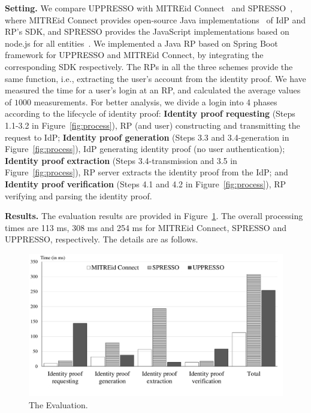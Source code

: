 \noindent\textbf{Setting.}
We compare UPPRESSO with MITREid Connect~\cite{MITREid} and SPRESSO~\cite{SPRESSO}, 
 where MITREid Connect provides open-source Java implementations~\cite{MITREid} of IdP and RP's SDK, 
  and SPRESSO provides the JavaScript implementations based on node.js for all entities~\cite{SPRESSO}.
We implemented a Java RP based on Spring Boot framework for UPPRESSO and MITREid Connect, by integrating the corresponding SDK respectively.
The RPs in all the three schemes provide the same function, i.e.,   extracting the user's account from the identity proof.
We have measured the time for a user's login at an RP, and calculated the average values of $1000$ measurements.
For better analysis, we divide a login into 4 phases according to the lifecycle of identity proof: 
 \textbf{Identity proof requesting} (Steps 1.1-3.2 in Figure~\ref{fig:process}), RP (and user) constructing and transmitting the request to IdP;
 \textbf{Identity proof generation} (Steps 3.3 and 3.4-generation in Figure~\ref{fig:process}), IdP generating identity proof (no user authentication);
 \textbf{Identity proof extraction} (Steps 3.4-transmission and 3.5 in Figure~\ref{fig:process}), RP server extracts the identity proof from the IdP;
 and \textbf{Identity proof verification} (Steps 4.1 and 4.2 in Figure~\ref{fig:process}), RP verifying and parsing the identity proof.

\noindent\textbf{Results.}
The evaluation results are provided in Figure~\ref{fig:evaluation}.
The overall processing times are  113 ms, 308 ms and 254 ms for MITREid Connect, SPRESSO and UPPRESSO, respectively.
The details are as follows.

\begin{figure}
  \centering
  \includegraphics[width=\linewidth]{fig/evaluation2.pdf}
  \caption{The Evaluation.}
  \label{fig:evaluation}
\end{figure}

